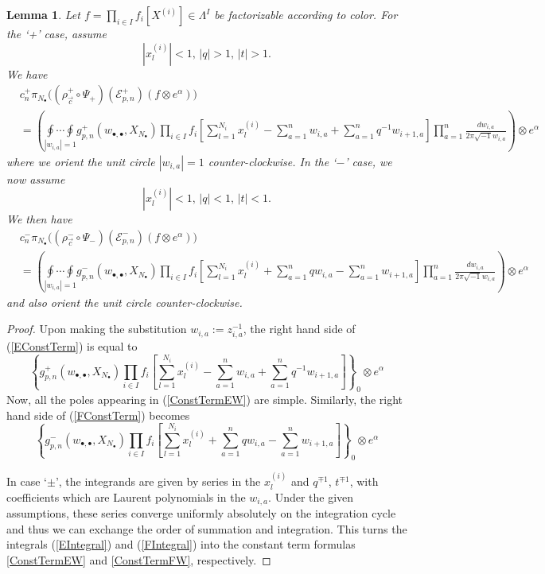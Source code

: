 \documentclass{amsart}
\newtheorem{lem}[thm]{Lemma}
\theoremstyle{remark}
\numberwithin{thm}{section}
\numberwithin{equation}{section}
\begin{document}
\begin{lem}\label{IntForm}
Let $f=\prod_{i\in I} f_i[X^{(i)}]\in\Lambda^I$ be factorizable according to color.
For the `+' case, assume
\[
|x_{l}^{(i)}|<1,\, |q|>1,\, |t|>1.
\]
We have
\begin{align}
\nonumber
&c_n^+
\pi_{N_\bullet}\biggl( (\rho_{\vec{c}}^+\circ\Psi_+)(\mathcal{E}_{p,n}^+)(f\otimes e^\alpha)\biggr)\\
\label{EIntegral}
&=\left(\underset{|w_{i,a}|=1}{\oint\cdots\oint}g_{p,n}^+(w_{\bullet,\bullet},X_{N_\bullet})
\prod_{i\in I}
f_i\left[ \sum_{l=1}^{N_i} x_{l}^{(i)}-\sum_{a=1}^nw_{i,a}+\sum_{a=1}^{n}q^{-1}w_{i+1,a} \right]
\prod_{a=1}^n \frac{dw_{i,a}}{2\pi\sqrt{-1}w_{i,a}}
\right)\otimes e^\alpha
\end{align}
where we orient the unit circle $|w_{i,a}|=1$ counter-clockwise.
In the `$-$' case, we now assume
\[
|x_{l}^{(i)}|<1,\, |q|<1,\, |t|<1.
\]
We then have
\begin{align}
\nonumber
&c_n^-
\pi_{N_\bullet}\biggl( (\rho_{\vec{c}}^-\circ\Psi_-)(\mathcal{E}_{p,n}^-)(f\otimes e^\alpha)\biggr)\\
\label{FIntegral}
&=\left(\underset{|w_{i,a}|=1}{\oint\cdots\oint}g_{p,n}^-(w_{\bullet,\bullet},X_{N_\bullet})
\prod_{i\in I}
f_i\left[ \sum_{l=1}^{N_i} x_{l}^{(i)}+\sum_{a=1}^nqw_{i,a}-\sum_{a=1}^nw_{i+1,a} \right]
\prod_{a=1}^n \frac{dw_{i,a}}{2\pi\sqrt{-1}w_{i,a}}
\right)\otimes e^\alpha
\end{align}
and also orient the unit circle counter-clockwise.
\end{lem}

\begin{proof}
Upon making the substitution $w_{i,a}:=z_{i,a}^{-1}$, the right hand side of (\ref{EConstTerm}) is equal to
\begin{equation}
\left\{g_{p,n}^+(w_{\bullet,\bullet},X_{N_\bullet})\prod_{i\in I}f_i\left[\sum_{l=1}^{N_i}  x_{l}^{(i)}-\sum_{a=1}^nw_{i,a}+\sum_{a=1}^nq^{-1}w_{i+1,a} \right]\right\}_0\otimes e^\alpha
\label{ConstTermEW}
\end{equation}
Now, all the poles appearing in (\ref{ConstTermEW}) are simple.
Similarly, the right hand side of (\ref{FConstTerm}) becomes
\begin{equation}
\left\{g_{p,n}^-(w_{\bullet,\bullet},X_{N_\bullet})\prod_{i\in I}f_i\left[  \sum_{l=1}^{N_i}x_{l}^{(i)}+\sum_{a=1}^nqw_{i,a}- \sum_{a=1}^nw_{i+1,a} \right]\right\}_0\otimes e^\alpha
\label{ConstTermFW}
\end{equation}

In case `$\pm$', the integrands are given by series in the $x^{(i)}_l$ and $q^{\mp 1}$, $t^{\mp 1}$, with coefficients which are Laurent polynomials in the $w_{i,a}$. Under the given assumptions, these series converge uniformly absolutely on the integration cycle and thus we can exchange the order of summation and integration. This turns the integrals (\ref{EIntegral}) and (\ref{FIntegral}) into the constant term formulas \eqref{ConstTermEW} and \eqref{ConstTermFW}, respectively.
\end{proof}
\end{document}
